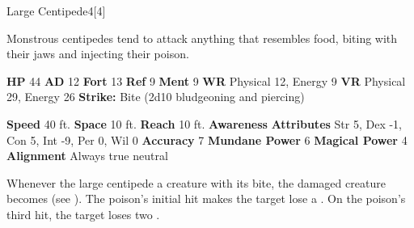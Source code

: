   \begin{monsection}{Large Centipede}{4}[4]
    \vspace{-1em}\vspace{-1em}
    \vspace{0em}

    
    Monstrous centipedes tend to attack anything that resembles food, biting with their jaws and injecting their poison.
  
    

    \begin{spellcontent}
      \begin{spelltargetinginfo}
        \pari \textbf{HP} 44 \monsep
          \textbf{AD} 12 \monsep
          \textbf{Fort} 13 \monsep
          \textbf{Ref} 9 \monsep
          \textbf{Ment} 9
        \pari \textbf{WR} Physical 12, Energy 9 \monsep
        \textbf{VR} Physical 29, Energy 26
        \pari \textbf{Strike:}
            Bite  (2d10 bludgeoning and piercing)
      \end{spelltargetinginfo}
    \end{spellcontent}
    \begin{monsterfooter}
      \pari \textbf{Speed} 40 ft. \monsep
        \textbf{Space} 10 ft. \monsep
        \textbf{Reach} 10 ft.
      \pari \textbf{Awareness} 
      \pari \textbf{Attributes}
        Str 5, Dex -1,
        Con 5, Int -9,
        Per 0, Wil 0
      \pari \textbf{Accuracy} 7 \monsep
        \textbf{Mundane Power} 6 \monsep
      \textbf{Magical Power} 4
      \pari \textbf{Alignment} Always true neutral
    \end{monsterfooter}
  \end{monsection}
        Whenever the large centipede  a creature with its bite,
          the damaged creature becomes  (see ).
        The poison's initial hit makes the target lose a .
        On the poison's third hit, the target loses two .
  
